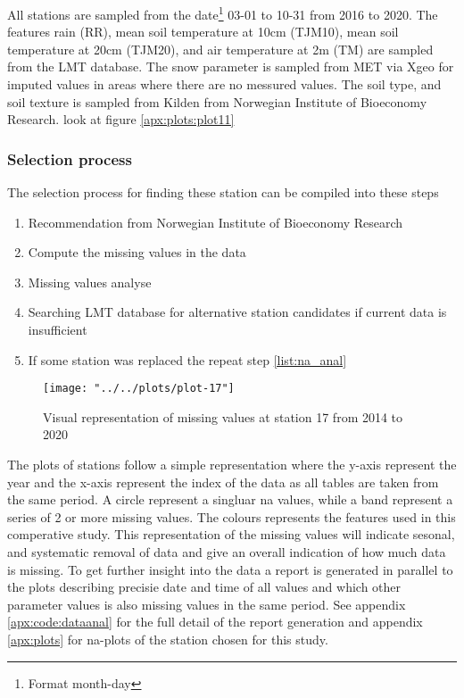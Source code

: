 All stations are sampled from the date\footnote{Format month-day} 03-01 to 10-31 from 2016 to 2020. The features rain (RR), mean soil temperature at 10cm (TJM10), mean soil temperature at 20cm (TJM20), and air temperature at 2m (TM) are sampled from the LMT database. The snow parameter is sampled from MET via Xgeo for imputed values in areas where there are no messured values. The soil type, and soil texture is sampled from Kilden from Norwegian Institute of Bioeconomy Research. look at figure \ref{apx:plots:plot11}

\subsubsection{Selection process}
The selection process for finding these station can be compiled into these steps

\begin{enumerate}
	\item Recommendation from Norwegian Institute of Bioeconomy Research
	\item \label{list:na_anal}Compute the missing values in the data
	\item Missing values analyse 
	\item Searching LMT database for alternative station candidates if current data is insufficient
	\item If some station was replaced the repeat step \ref{list:na_anal}
\end{enumerate}

\begin{figure}
	\label{fig:plot-17}
	\texttt{[image: "../../plots/plot-17"]}
	\caption{Visual representation of missing values at station 17 from 2014 to 2020}
\end{figure}

The plots of stations follow a simple representation where the y-axis represent the year and the x-axis represent the index of the data as all tables are taken from the same period. A circle represent a singluar na values, while a band represent a series of 2 or more missing values. The colours represents the features used in this comperative study. This representation of the missing values will indicate sesonal, and systematic removal of data and give an overall indication of how much data is missing. To get further insight into the data a report is generated in parallel to the plots describing precisie date and time of all values and which other parameter values is also missing values in the same period. See appendix \ref{apx:code:dataanal} for the full detail of the report generation and appendix \ref{apx:plots} for na-plots of the station chosen for this study.

